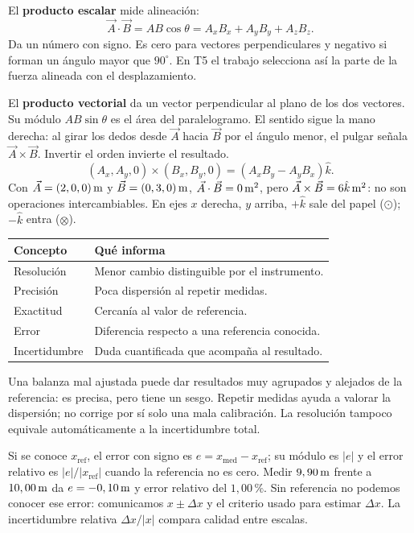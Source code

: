 \documentclass[11pt,a4paper]{article}
\begin{document}
El \textbf{producto escalar} mide alineaci\'on:
\[
\vec A\cdot\vec B=AB\cos\theta=A_xB_x+A_yB_y+A_zB_z.
\]
Da un n\'umero con signo. Es cero para vectores perpendiculares y negativo si
forman un \'angulo mayor que $90^\circ$. En T5 el trabajo selecciona as\'i la parte
de la fuerza alineada con el desplazamiento.

El \textbf{producto vectorial} da un vector perpendicular al plano de los dos
vectores. Su m\'odulo $AB\sin\theta$ es el \'area del paralelogramo.
El sentido sigue la mano derecha: al girar los dedos desde $\vec A$ hacia $\vec B$
por el \'angulo menor, el pulgar se\~nala $\vec A\times\vec B$.
Invertir el orden invierte el resultado.
\[
(A_x,A_y,0)\times(B_x,B_y,0)=(A_xB_y-A_yB_x)\hat k.
\]
Con $\vec A=(2,0,0)\,\mathrm{m}$ y $\vec B=(0,3,0)\,\mathrm{m}$,
$\vec A\cdot\vec B=0\,\mathrm{m^2}$, pero
$\vec A\times\vec B=6\hat k\,\mathrm{m^2}$: no son operaciones intercambiables.
En ejes $x$ derecha, $y$ arriba, $+\hat k$ sale del papel ($\odot$);
$-\hat k$ entra ($\otimes$).

\begin{tabularx}{\linewidth}{@{}p{2.8cm}Y@{}}
\toprule
Concepto & Qu\'e informa\\
\midrule
Resoluci\'on & Menor cambio distinguible por el instrumento.\\
Precisi\'on & Poca dispersi\'on al repetir medidas.\\
Exactitud & Cercan\'ia al valor de referencia.\\
Error & Diferencia respecto a una referencia conocida.\\
Incertidumbre & Duda cuantificada que acompa\~na al resultado.\\
\bottomrule
\end{tabularx}
Una balanza mal ajustada puede dar resultados muy agrupados y alejados de la
referencia: es precisa, pero tiene un sesgo. Repetir medidas ayuda a valorar la
dispersi\'on; no corrige por s\'i solo una mala calibraci\'on.
La resoluci\'on tampoco equivale autom\'aticamente a la incertidumbre total.

Si se conoce $x_{\mathrm{ref}}$, el error con signo es $e=x_{\mathrm{med}}-x_{\mathrm{ref}}$;
su m\'odulo es $|e|$ y el error relativo es $|e|/|x_{\mathrm{ref}}|$ cuando la
referencia no es cero. Medir $9,90\,\mathrm{m}$ frente a $10,00\,\mathrm{m}$ da
$e=-0,10\,\mathrm{m}$ y error relativo del $1,00\,\text{\%}$.
Sin referencia no podemos conocer ese error: comunicamos $x\pm\Delta x$ y
el criterio usado para estimar $\Delta x$.
La incertidumbre relativa $\Delta x/|x|$ compara calidad entre escalas.
\end{document}
